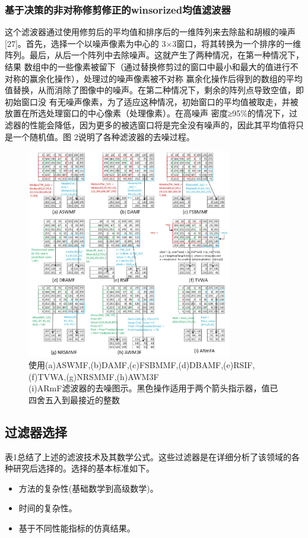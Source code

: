 \documentclass[12pt]{article} %
\begin{document}
\subsubsection{基于决策的非对称修剪修正的winsorized均值滤波器}
这个滤波器通过使用修剪后的平均值和排序后的一维阵列来去除盐和胡椒的噪声[27]。首先，选择一个以噪声像素为中心的
3×3窗口，将其转换为一个排序的一维阵列。最后，从后一个阵列中去除噪声。这就产生了两种情况，在第一种情况下，结果
数组中的一些像素被留下（通过替换修剪过的窗口中最小和最大的值进行不对称的赢余化操作），处理过的噪声像素被不对称
赢余化操作后得到的数组的平均值替换，从而消除了图像中的噪声。在第二种情况下，剩余的阵列点导致空值，即初始窗口没
有无噪声像素，为了适应这种情况，初始窗口的平均值被取走，并被放置在所选处理窗口的中心像素（处理像素）。在高噪声
密度≥95\%的情况下，过滤器的性能会降低，因为更多的被选窗口将是完全没有噪声的，因此其平均值将只是一个随机值。图
2说明了各种滤波器的去噪过程。
 
\begin{figure}[H]
    \centering
    \includegraphics[width=0.8\textwidth]{images/02.eps}
    \caption{使用(a)ASWMF,(b)DAMF,(c)FSBMMF,(d)DBAMF,(e)RSIF,(f)TVWA,(g)NRSMMF,(h)AWM3F\\
    (i)ARmF滤波器的去噪图示。黑色操作适用于两个箭头指示器，值已四舍五入到最接近的整数}
    \label{fig:mean}
\end{figure}

\subsection{过滤器选择}
表1总结了上述的滤波技术及其数学公式。这些过滤器是在详细分析了该领域的各种研究后选择的。选择的基本标准如下。
\begin{itemize}
    \item 方法的复杂性(基础数学到高级数学)。
    \item 时间的复杂性。
    \item 基于不同性能指标的仿真结果。
\end{itemize}
\end{document}
